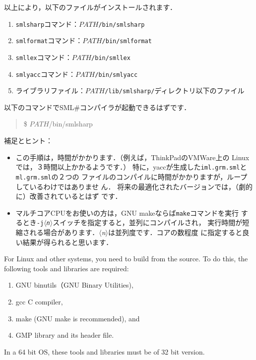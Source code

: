 \documentclass{jbook}
\newcommand{\smlsharp}{SML\#}
\newcommand{\nonterm}[1]{\mbox{$\langle$}{\it #1}\mbox{$\rangle$}}
\newenvironment{program}{\begin{tt}\begin{quote}}{\end{quote}\end{tt}}
\begin{document}
	以上により，以下のファイルがインストールされます．
\begin{enumerate}
\item {\tt smlsharp}コマンド：{\tt $PATH$/bin/smlsharp}
\item {\tt smlformat}コマンド：{\tt $PATH$/bin/smlformat}
\item {\tt smllex}コマンド：{\tt $PATH$/bin/smllex}
\item {\tt smlyacc}コマンド：{\tt $PATH$/bin/smlyacc}
\item ライブラリファイル：{\tt $PATH$/lib/smlsharp/}ディレクトリ以下のファイル
\end{enumerate}
以下のコマンドで\smlsharp{}コンパイラが起動できるはずです．
\begin{program}
\$ $PATH$/bin/smlsharp
\end{program}

補足とヒント：
\begin{itemize}
\item 
	この手順は，時間がかかります．（例えば，ThinkPadのVMWare上の
Linux では，３時間以上かかるようです．）
	特に，yaccが生成した{\tt iml.grm.sml}と{\tt ml.grm.sml}の２つの
ファイルのコンパイルに時間がかかりますが，ループしているわけではありませ
ん．
	将来の最適化されたバージョンでは，（劇的に）改善されているとはず
です．
\item マルチコアCPUをお使いの方は，GNU makeならば{\tt make}コマンドを実行
するとき{\tt -j\nonterm{n}}スイッチを指定すると，並列にコンパイルされ，
実行時間が短縮される場合があります．\nonterm{n}は並列度です．コアの数程度
に指定すると良い結果が得られると思います．
\end{itemize}

\else%
	For Linux and other systems, you need to build from the source.
	To do this, the following tools and libraries are required:
\begin{enumerate}
\item GNU binutils（GNU Binary Utilities),
\item gcc C compiler,
\item make (GNU make is recommended), and
\item GMP library and its header file.
\end{enumerate}
	In a 64 bit OS, these tools and libraries must be of 32 bit version.
\end{document}
